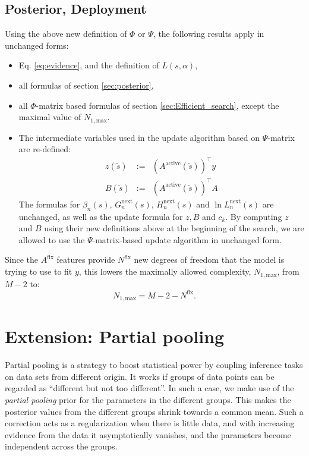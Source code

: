 \documentclass[letter,10pt,oneside]{article}
\newcommand{\be}{\begin{equation*}}
\newcommand{\ee}{\end{equation*}}
\newcommand{\ba}{\begin{eqnarray*}}
\newcommand{\ea}{\end{eqnarray*}}
\newcommand{\no}{\noindent}
\newcommand{\+}{^\dagger}
\newcommand{\T}{^\top}
\newcommand{\refeq}[1]{Eq. \ref{#1}}
\begin{document}
\subsection{Posterior, Deployment}
\no Using the above new definition of $\Phi$ or $\Psi$, the following results apply in unchanged forms:
\begin{itemize}
  \item \refeq{eq:evidence}, and the definition of $L(s, \alpha)$,
  \item all formulas of section \ref{sec:posterior},
  \item all $\Phi$-matrix based formulas of section \ref{sec:Efficient_search}, except the maximal value of $N_{1,\text{max}}$.
  \item The intermediate variables used in the update algorithm based on $\Psi$-matrix are re-defined:
\ba
  z(\tilde s) &:=& (A^\text{active}(\tilde s))\T y \\
  B(\tilde s) &:=& (A^\text{active} (\tilde s))\T A
\ea
The formulas for $\beta_n(s)$, $G_n^\text{next}(s)$, $H_n^\text{next}(s)$ and $\ln L_n^\text{next}(s)$ are unchanged, as well as the update formula for $z, B$ and $c_k$. By computing $z$ and $B$ using their new definitions above at the beginning of the search, we are allowed to use the $\Psi$-matrix-based update algorithm in unchanged form.

\end{itemize}


Since the $A^\text{fix}$ features provide $N^\text{fix}$ new degrees of freedom that the model is trying to use to fit $y$, this lowers the maximally allowed complexity, $N_{1,\text{max}}$, from $M-2$ to:
\be
  N_{1,\text{max}} = M - 2 - N^\text{fix}.
\ee

\section{Extension: Partial pooling}
Partial pooling is a strategy to boost statistical power by  coupling inference tasks on data sets from different origin. It works if groups of data points can be regarded as ``different but not too different''. In such a case, we make use of the \emph{partial pooling} prior for the parameters in the different groups. This makes the posterior values from the different groups shrink towards a common mean. Such a correction acts as a regularization when there is little data, and with increasing evidence from the data it asymptotically vanishes, and the parameters become independent across the groups.
\end{document}
